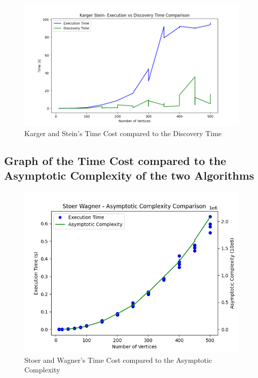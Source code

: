 \begin{figure}[H]
	\hspace{0cm}\includegraphics[width=17cm]{Img/KargerStein_DiscoveryComparison.png}
	\caption{Karger and Stein's Time Cost compared to the Discovery Time}
\end{figure}



\subsection{Graph of the Time Cost compared to the Asymptotic Complexity of the two Algorithms}

\begin{figure}[H]
	\hspace{0cm}\includegraphics[width=17cm]{Img/StoerWagner_ComplexityComparison.png}
	\caption{Stoer and Wagner's Time Cost compared to the Asymptotic Complexity}
\end{figure}

